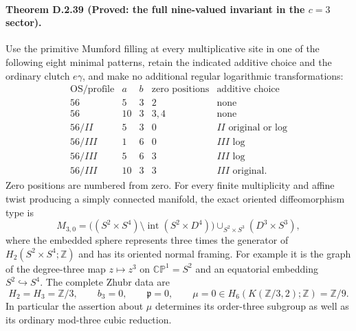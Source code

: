 \paragraph{Theorem D.2.39 (Proved: the full nine-valued invariant in the $c=3$ sector).}
Use the primitive Mumford filling at every multiplicative site in one
of the following eight minimal patterns, retain the indicated additive
choice and the ordinary clutch $e\gamma$, and make no additional
regular logarithmic transformations:
\[
\begin{array}{c|r|r|l|l}
\text{OS/profile}&a&b&\text{zero positions}&\text{additive choice}\\\hline
56&5&3&2&\text{none}\\
56&10&3&3,4&\text{none}\\
56/II&5&3&0&II\text{ original or log}\\
56/III&1&6&0&III\text{ log}\\
56/III&5&6&3&III\text{ log}\\
56/III&10&3&3&III\text{ original}.
\end{array}                                                   \tag{D.T31}
\]
Zero positions are numbered from zero. For every finite multiplicity
and affine twist producing a simply connected manifold, the exact
oriented diffeomorphism type is
\[
 M_{3,0}=\bigl((S^2\times S^4)\setminus
          \operatorname{int}(S^2\times D^4)\bigr)
               \mathop{\cup}_{S^2\times S^3}(D^3\times S^3),     \tag{D.T32}
\]
where the embedded sphere represents three times the generator of
$H_2(S^2\times S^4;\mathbb Z)$ and has its oriented normal framing.
For example it is the graph of the degree-three map
$z\mapsto z^3$ on $\mathbb {CP}^1=S^2$ and an equatorial embedding
$S^2\hookrightarrow S^4$.
The complete Zhubr data are
\[
 H_2=H_3=\mathbb Z/3,\qquad b_3=0,\qquad
 \mathfrak p=0,\qquad
 \mu=0\in H_6(K(\mathbb Z/3,2);\mathbb Z)=\mathbb Z/9.          \tag{D.T33}
\]
In particular the assertion about $\mu$ determines its order-three
subgroup as well as its ordinary mod-three cubic reduction.

